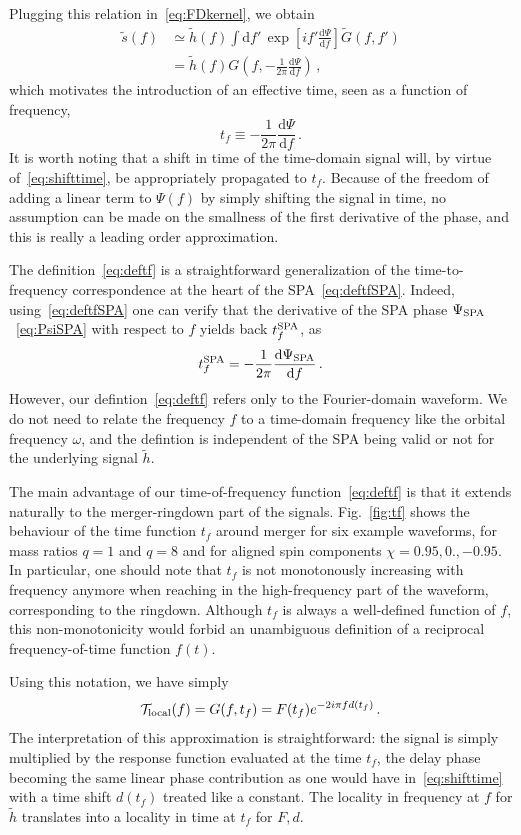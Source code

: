\documentclass[aps,showpacs,twocolumn,
prd,superscriptaddress,nofootinbib]{revtex4-1}
\newcommand{\be}{\begin{equation}}
\newcommand{\ee}{\end{equation}}
\newcommand\ud{{\mathrm{d}}}
\newcommand\calT{{\mathcal{T}}}
\newcommand{\nn}{\nonumber}
\newcommand{\tf}{t_{f}}
\newcommand{\tfSPA}{t_{f}^{\rm SPA}}
\begin{document}
Plugging this relation in~\eqref{eq:FDkernel}, we obtain
\begin{align}
	\tilde{s}(f) &\simeq \tilde{h}(f) \int \ud f' \, \exp\left[ i f' \frac{\ud \Psi}{\ud f} \right] \tilde{G}(f,f') \nn\\
	&= \tilde{h}(f) G\left( f, -\frac{1}{2\pi} \frac{\ud \Psi}{\ud f} \right) \,,
\end{align}
which motivates the introduction of an effective time, seen as a function of frequency,
\be\label{eq:deftf}
	\tf \equiv -\frac{1}{2\pi} \frac{\ud \Psi}{\ud f} \,.
\ee
It is worth noting that a shift in time of the time-domain signal will, by virtue of~\eqref{eq:shifttime}, be appropriately propagated to $t_{f}$. Because of the freedom of adding a linear term to $\Psi(f)$ by simply shifting the signal in time, no assumption can be made on the smallness of the first derivative of the phase, and this is really a leading order approximation.

The definition~\eqref{eq:deftf} is a straightforward generalization of the time-to-frequency correspondence at the heart of the SPA~\eqref{eq:deftfSPA}. Indeed, using~\eqref{eq:deftfSPA} one can verify that the derivative of the SPA phase $\Psi_{\rm SPA}$~\eqref{eq:PsiSPA} with respect to $f$ yields back $\tfSPA$, as
\be
	\tfSPA = -\frac{1}{2\pi} \frac{\ud \Psi_{\rm SPA}}{\ud f} \,.
\ee
However, our defintion~\eqref{eq:deftf} refers only to the Fourier-domain waveform. We do not need to relate the frequency $f$ to a time-domain frequency like the orbital frequency $\omega$, and the defintion is independent of the SPA being valid or not for the underlying signal $\tilde{h}$.

The main advantage of our time-of-frequency function~\eqref{eq:deftf} is that it extends naturally to the merger-ringdown part of the signals. Fig.~\ref{fig:tf} shows the behaviour of the time function $\tf$ around merger for six example waveforms, for mass ratios $q=1$ and $q=8$ and for aligned spin components $\chi=0.95,0.,-0.95$. In particular, one should note that $\tf$ is not monotonously increasing with frequency anymore when reaching in the high-frequency part of the waveform, corresponding to the ringdown. Although $t_{f}$ is always a well-defined function of $f$, this non-monotonicity would forbid an unambiguous definition of a reciprocal frequency-of-time function $f(t)$.

Using this notation, we have simply
\be\label{eq:transferlocal}
	\calT_{\rm local}(f) = G(f, \tf) = F(t_{f}) e^{-2i\pi f d(t_{f})}\,.
\ee
The interpretation of this approximation is straightforward: the signal is simply multiplied by the response function evaluated at the time $\tf$, the delay phase becoming the same linear phase contribution as one would have in~\eqref{eq:shifttime} with a time shift $d(t_{f})$ treated like a constant. The locality in frequency at $f$ for $\tilde{h}$ translates into a locality in time at $t_{f}$ for $F,d$.
\end{document}

